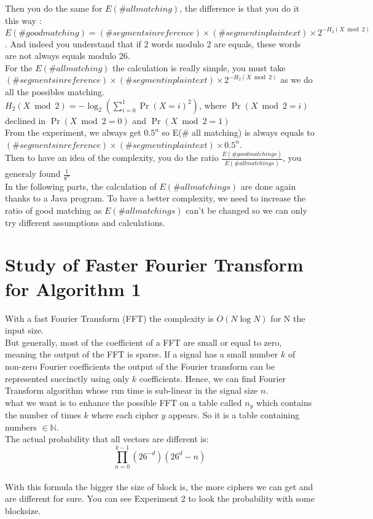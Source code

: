\documentclass{article}
\begin{document}
Then you do the same for  $E(\# all matching)$, the difference is that you do it this way : $E(\# good matching) = (\# segments in reference) \times (\#segment in plaintext) \times 2^{-H_{2}(X \bmod 2)}$ . And indeed you understand that if 2 words modulo 2 are equals, these words are not always equals modulo 26.\\
${}$\hspace{1em}For the $E(\# all matching)$ the calculation is really simple, you must take $(\# segments in reference) \times (\#segment in plaintext) \times 2^{-H_{2}(X \bmod 2)}$ as we do all the possibles matching.\\
$H_{2}(X \bmod 2) = -\log_2(\sum_{i=0}^{1}{\Pr(X=i)^2})$, where $\Pr(X \bmod 2=i)$ declined in $\Pr(X \bmod 2=0)$ and $\Pr(X \bmod 2 =1)$\\
From the experiment, we always get $0.5^n$ so E(\# all matching) is always equals to $(\# segments in reference) \times (\#segment in plaintext) \times 0.5^n$.\\
Then to have an idea of the complexity, you do the ratio $\frac{E(\# good matchings)}{E(\# all matchings)}$, you generaly found $\frac{1}{8^n}$\\
In the following parts, the calculation of $E(\# all matchings)$ are done again thanks to a Java program.
To have a better complexity, we need to increase the ratio of good matching as $E(\# all matchings)$ can't be changed so we can only try different assumptions and calculations.\\


\section{Study of Faster Fourier Transform for Algorithm 1}
With a fast Fourier Transform (FFT) the complexity is $O(N\log N)$ for N the input size.\\
But generally, most of the coefficient of a FFT are small or equal to zero, meaning the output of the FFT is sparse. If a signal has a small number $k$ of non-zero Fourier coefficients the output of the Fourier transform can be represented succinctly using only $k$ coefficients. Hence, we can find Fourier Transform algorithm whose run time is sub-linear in the signal size $n$.\\
what we want is to enhance the possible FFT on a table called $n_y$ which contains the number of times $k$ where each cipher $y$ appears. So it is a table containing numbers $\in \mathbb{N}$.\\
The actual probability that all vectors are different is:
$$\prod_{n=0}^{k-1}{(26^{-d})(26^d -n)}$$\\
With this formula the bigger the size of block is, the more ciphers we can get and are different for sure. You can see Experiment 2 to look the probability with some blocksize.\\
\end{document}
